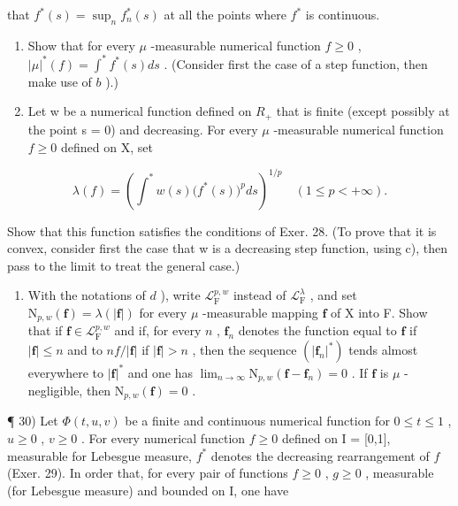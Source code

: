 that \(f^{*}(s) = \sup_{n}f_{n}^{*}(s)\) at all the points where \(f^{*}\) is continuous.

\begin{enumerate}
\def\labelenumi{\alph{enumi})}
\setcounter{enumi}{2}
\item
  Show that for every \(\mu\) -measurable numerical function \(f \geqslant 0\) , \(|\mu|^{*}(f) = \int^{*} f^{*}(s) ds\) . (Consider first the case of a step function, then make use of \(b\) ).)
\item
  Let w be a numerical function defined on \(R_{+}\) that is finite (except possibly at the point s = 0) and decreasing. For every \(\mu\) -measurable numerical function \(f \geqslant 0\) defined on X, set
\end{enumerate}

\[
\lambda (f) = \left(\int^ {*} w (s) \bigl (f ^ {*} (s) \bigr) ^ {p} d s\right) ^ {1 / p} \quad (1 \leqslant p <   + \infty).
\]

Show that this function satisfies the conditions of Exer. 28. (To prove that it is convex, consider first the case that w is a decreasing step function, using c), then pass to the limit to treat the general case.)

\begin{enumerate}
\def\labelenumi{\alph{enumi})}
\setcounter{enumi}{4}
\tightlist
\item
  With the notations of \(d\) ), write \(\mathcal{L}_{\mathrm{F}}^{p,w}\) instead of \(\mathcal{L}_{\mathrm{F}}^{\lambda}\) , and set \(\mathrm{N}_{p,w}(\mathbf{f}) = \lambda (|\mathbf{f}|)\) for every \(\mu\) -measurable mapping \(\mathbf{f}\) of X into F. Show that if \(\mathbf{f} \in \mathcal{L}_{\mathrm{F}}^{p,w}\) and if, for every \(n\) , \(\mathbf{f}_n\) denotes the function equal to \(\mathbf{f}\) if \(|\mathbf{f}| \leqslant n\) and to \(nf / |\mathbf{f}|\) if \(|\mathbf{f}| > n\) , then the sequence \((|\mathbf{f}_n|^*)\) tends almost everywhere to \(|\mathbf{f}|^*\) and one has \(\lim_{n \to \infty} \mathrm{N}_{p,w}(\mathbf{f} - \mathbf{f}_n) = 0\) . If \(\mathbf{f}\) is \(\mu\) -negligible, then \(\mathrm{N}_{p,w}(\mathbf{f}) = 0\) .
\end{enumerate}

¶ 30) Let \(\Phi(t, u, v)\) be a finite and continuous numerical function for \(0 \leqslant t \leqslant 1\) , \(u \geqslant 0\) , \(v \geqslant 0\) . For every numerical function \(f \geqslant 0\) defined on I = {[}0,1{]}, measurable for Lebesgue measure, \(f^*\) denotes the decreasing rearrangement of \(f\) (Exer. 29). In order that, for every pair of functions \(f \geqslant 0\) , \(g \geqslant 0\) , measurable (for Lebesgue measure) and bounded on I, one have

